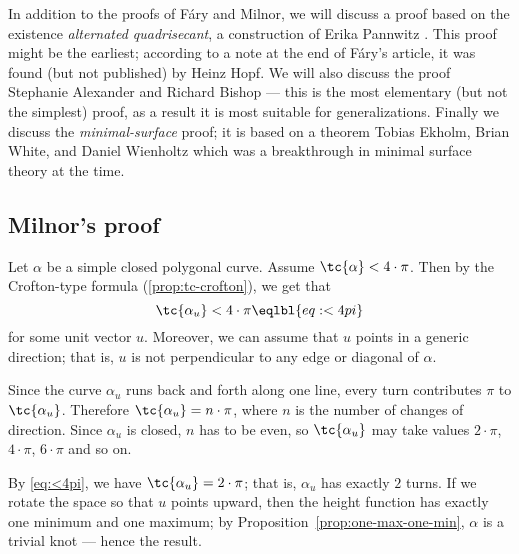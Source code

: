 In addition to the proofs of Fáry and Milnor,
we will discuss a proof based on the existence \emph{alternated quadrisecant}, a construction of Erika Pannwitz \cite{pannwitz}.
This proof might be the earliest; according to a note at the end of Fáry’s article, it was found (but not published) by Heinz Hopf.
We will also discuss the proof Stephanie Alexander and Richard Bishop --- this is the most elementary (but not the simplest) proof, as a result it is most suitable for generalizations.
Finally we discuss the \emph{minimal-surface} proof;
it is based on a theorem Tobias Ekholm, Brian White, and Daniel Wienholtz \cite{EWW_embed} which was a breakthrough in minimal surface theory at the time.
































\subsection*{Milnor's proof}

Let $\alpha$ be a simple closed polygonal curve.
Assume $\tc{\alpha}<4\cdot\pi$.
Then by the Crofton-type formula (\ref{prop:tc-crofton}), we get that
\[\tc{\alpha_u}<4\cdot\pi
\eqlbl{eq:<4pi}\]
for some unit vector $u$.
Moreover, we can assume that $u$ points in a generic direction;
that is, $u$ is not perpendicular to any edge or diagonal of $\alpha$.

Since the curve $\alpha_u$ runs back and forth along one line, 
every turn contributes $\pi$ to  $\tc{\alpha_u}$.
Therefore $\tc{\alpha_u}=n\cdot\pi$, where $n$ is the number of changes of direction.
Since $\alpha_u$ is closed, $n$ has to be even, so $\tc{\alpha_u}$ may take values $2\cdot\pi$, $4\cdot\pi$, $6\cdot\pi$ and so on.

By \ref{eq:<4pi}, we have $\tc{\alpha_u}= 2\cdot\pi$;
that is, $\alpha_u$ has exactly $2$ turns.
If we rotate the space so that $u$ points upward,
then the height function has exactly one minimum and one maximum;
by Proposition~\ref{prop:one-max-one-min}, $\alpha$ is a trivial knot --- hence the result.
\qeds

























